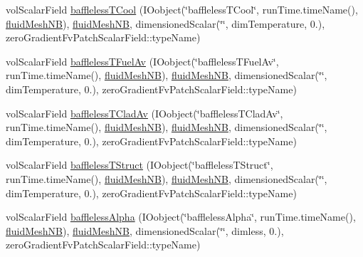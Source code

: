 \begin{DoxyCompactItemize}
\item 
vol\+Scalar\+Field \hyperlink{createCouplingFields_8H_a53efc3c92a79074d539e2ef4861a88ad}{baffleless\+T\+Cool} (I\+Oobject(\char`\"{}baffleless\+T\+Cool\char`\"{}, run\+Time.\+time\+Name(), \hyperlink{createFluidMesh_8H_a19096e6b5a147939b336269d09a08e3c}{fluid\+Mesh\+NB}), \hyperlink{createFluidMesh_8H_a19096e6b5a147939b336269d09a08e3c}{fluid\+Mesh\+NB}, dimensioned\+Scalar(\char`\"{}\char`\"{}, dim\+Temperature, 0.), zero\+Gradient\+Fv\+Patch\+Scalar\+Field\+::type\+Name)
\item 
vol\+Scalar\+Field \hyperlink{createCouplingFields_8H_abd5a67b58d70ace64497ec9cd47dadda}{baffleless\+T\+Fuel\+Av} (I\+Oobject(\char`\"{}baffleless\+T\+Fuel\+Av\char`\"{}, run\+Time.\+time\+Name(), \hyperlink{createFluidMesh_8H_a19096e6b5a147939b336269d09a08e3c}{fluid\+Mesh\+NB}), \hyperlink{createFluidMesh_8H_a19096e6b5a147939b336269d09a08e3c}{fluid\+Mesh\+NB}, dimensioned\+Scalar(\char`\"{}\char`\"{}, dim\+Temperature, 0.), zero\+Gradient\+Fv\+Patch\+Scalar\+Field\+::type\+Name)
\item 
vol\+Scalar\+Field \hyperlink{createCouplingFields_8H_ad22b56e591671f9c843bbf8f4e059bca}{baffleless\+T\+Clad\+Av} (I\+Oobject(\char`\"{}baffleless\+T\+Clad\+Av\char`\"{}, run\+Time.\+time\+Name(), \hyperlink{createFluidMesh_8H_a19096e6b5a147939b336269d09a08e3c}{fluid\+Mesh\+NB}), \hyperlink{createFluidMesh_8H_a19096e6b5a147939b336269d09a08e3c}{fluid\+Mesh\+NB}, dimensioned\+Scalar(\char`\"{}\char`\"{}, dim\+Temperature, 0.), zero\+Gradient\+Fv\+Patch\+Scalar\+Field\+::type\+Name)
\item 
vol\+Scalar\+Field \hyperlink{createCouplingFields_8H_ab24f0221414a25d346f3ec78bb700050}{baffleless\+T\+Struct} (I\+Oobject(\char`\"{}baffleless\+T\+Struct\char`\"{}, run\+Time.\+time\+Name(), \hyperlink{createFluidMesh_8H_a19096e6b5a147939b336269d09a08e3c}{fluid\+Mesh\+NB}), \hyperlink{createFluidMesh_8H_a19096e6b5a147939b336269d09a08e3c}{fluid\+Mesh\+NB}, dimensioned\+Scalar(\char`\"{}\char`\"{}, dim\+Temperature, 0.), zero\+Gradient\+Fv\+Patch\+Scalar\+Field\+::type\+Name)
\item 
vol\+Scalar\+Field \hyperlink{createCouplingFields_8H_afc97dbe3594c6c5e83614b918a2c2ea5}{baffleless\+Alpha} (I\+Oobject(\char`\"{}baffleless\+Alpha\char`\"{}, run\+Time.\+time\+Name(), \hyperlink{createFluidMesh_8H_a19096e6b5a147939b336269d09a08e3c}{fluid\+Mesh\+NB}), \hyperlink{createFluidMesh_8H_a19096e6b5a147939b336269d09a08e3c}{fluid\+Mesh\+NB}, dimensioned\+Scalar(\char`\"{}\char`\"{}, dimless, 0.), zero\+Gradient\+Fv\+Patch\+Scalar\+Field\+::type\+Name)

\end{DoxyCompactItemize}
